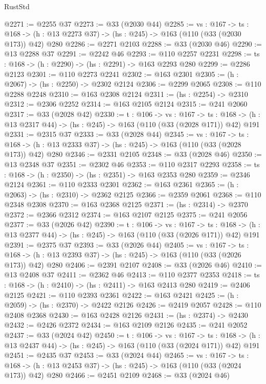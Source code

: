 \begin{lexlean}{RustStd}
\begin{coremodule}
@2271 := @2255 @37
@2273 := @33 (@2030 @44)
@2285 := {vs : @167} ->
  {ts : @168} -> (h : @13 @2273 @37) -> (hs : @245) -> @163 (@110 (@33 (@2030 @173)) @42) @280
@2286 := @2271 @2103
@2288 := @33 (@2030 @46)
@2290 := @13 @2288 @37
@2291 := @2242 @46
@2293 := @110 @2257 @2231
@2298 := {ts : @168} -> (h : @2290) -> (hs : @2291) -> @163 @2293 @280
@2299 := @2286 @2123
@2301 := @110 @2273 @2241
@2302 := @163 @2301
@2305 := (h : @2067) -> (hs : @2250) -> @2302 @2124
@2306 := @2299 @2065
@2308 := @110 @2288 @2248
@2310 := @163 @2308 @2124
@2311 := (hs : @2254) -> @2310
@2312 := @2306 @2252
@2314 := @163 @2105 @2124
@2315 := @241 @2060
@2317 := @33 (@2028 @42)
@2330 := {t : @106} ->
  {vs : @167} ->
  {ts : @168} -> (h : @13 @2317 @44) -> (hs : @245) -> @163 (@110 (@33 (@2028 @171)) @42) @191
@2331 := @2315 @37
@2333 := @33 (@2028 @44)
@2345 := {vs : @167} ->
  {ts : @168} -> (h : @13 @2333 @37) -> (hs : @245) -> @163 (@110 (@33 (@2028 @173)) @42) @280
@2346 := @2331 @2105
@2348 := @33 (@2028 @46)
@2350 := @13 @2348 @37
@2351 := @2302 @46
@2353 := @110 @2317 @2293
@2358 := {ts : @168} -> (h : @2350) -> (hs : @2351) -> @163 @2353 @280
@2359 := @2346 @2124
@2361 := @110 @2333 @2301
@2362 := @163 @2361
@2365 := (h : @2063) -> (hs : @2310) -> @2362 @2125
@2366 := @2359 @2061
@2368 := @110 @2348 @2308
@2370 := @163 @2368 @2125
@2371 := (hs : @2314) -> @2370
@2372 := @2366 @2312
@2374 := @163 @2107 @2125
@2375 := @241 @2056
@2377 := @33 (@2026 @42)
@2390 := {t : @106} ->
  {vs : @167} ->
  {ts : @168} -> (h : @13 @2377 @44) -> (hs : @245) -> @163 (@110 (@33 (@2026 @171)) @42) @191
@2391 := @2375 @37
@2393 := @33 (@2026 @44)
@2405 := {vs : @167} ->
  {ts : @168} -> (h : @13 @2393 @37) -> (hs : @245) -> @163 (@110 (@33 (@2026 @173)) @42) @280
@2406 := @2391 @2107
@2408 := @33 (@2026 @46)
@2410 := @13 @2408 @37
@2411 := @2362 @46
@2413 := @110 @2377 @2353
@2418 := {ts : @168} -> (h : @2410) -> (hs : @2411) -> @163 @2413 @280
@2419 := @2406 @2125
@2421 := @110 @2393 @2361
@2422 := @163 @2421
@2425 := (h : @2059) -> (hs : @2370) -> @2422 @2126
@2426 := @2419 @2057
@2428 := @110 @2408 @2368
@2430 := @163 @2428 @2126
@2431 := (hs : @2374) -> @2430
@2432 := @2426 @2372
@2434 := @163 @2109 @2126
@2435 := @241 @2052
@2437 := @33 (@2024 @42)
@2450 := {t : @106} ->
  {vs : @167} ->
  {ts : @168} -> (h : @13 @2437 @44) -> (hs : @245) -> @163 (@110 (@33 (@2024 @171)) @42) @191
@2451 := @2435 @37
@2453 := @33 (@2024 @44)
@2465 := {vs : @167} ->
  {ts : @168} -> (h : @13 @2453 @37) -> (hs : @245) -> @163 (@110 (@33 (@2024 @173)) @42) @280
@2466 := @2451 @2109
@2468 := @33 (@2024 @46)

\end{coremodule}
\end{lexlean}

